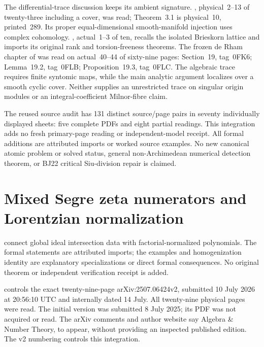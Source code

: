 The differential-trace discussion keeps its ambient signature.
\cite{Wells74ComparisonPublished}, physical~2--13 of
twenty-three including a cover, was read; Theorem~3.1 is
physical~10, printed~289. Its proper equal-dimensional
smooth-manifold injection uses complex cohomology.
\cite{Sabbah18BrieskornPublished}, actual~1--3 of ten,
recalls the isolated Brieskorn lattice and imports its
original rank and torsion-freeness theorems. The frozen
de Rham chapter of \cite{StacksProject} was read on
actual~40--44 of sixty-nine pages: Section~19, tag~0FK6;
Lemma~19.2, tag~0FLB; Proposition~19.3, tag~0FLC.
The algebraic trace requires finite syntomic maps, while
the main analytic argument localizes over a smooth cyclic
cover. Neither supplies an unrestricted trace on singular
origin modules or an integral-coefficient Milnor-fibre claim.

The reused source audit has 131 distinct source/page pairs
in seventy individually displayed sheets: five complete
PDFs and eight partial readings. This integration adds no
fresh primary-page reading or independent-model receipt.
All formal additions are attributed imports or worked
source examples. No new canonical atomic problem or solved
status, general non-Archimedean numerical detection theorem,
or BJ22 critical Siu-division repair is claimed.

\section{Mixed Segre zeta numerators and Lorentzian normalization}
\label{sec:appL-mixed-Segre-source-gates}

connect global ideal intersection data with factorial-normalized
polynomials. The formal statements are attributed imports;
the examples and homogenization identity are explanatory
specializations or direct formal consequences. No original
theorem or independent verification receipt is added.

\cite{CidRuiz26MixedSegreV2} controls the exact
twenty-nine-page arXiv:2507.06424v2, submitted 10 July 2026
at 20:56:10 UTC and internally dated 14 July. All twenty-nine
physical pages were read. The initial version was submitted
8 July 2025; its PDF was not acquired or read. The arXiv
comments and author website say Algebra \& Number Theory,
to appear, without providing an inspected published edition.
The v2 numbering controls this integration.

